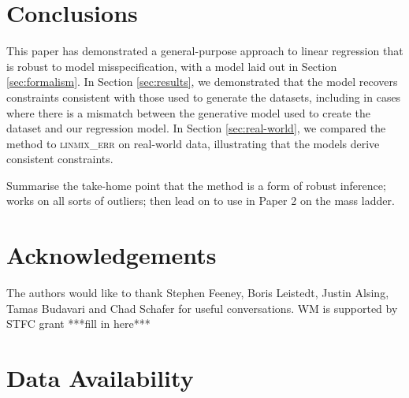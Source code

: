 \documentclass[fleqn,usenatbib]{mnras}
\begin{document}


\section{Conclusions}
\label{sec:conclusion}

This paper has demonstrated a general-purpose approach to linear regression that
is robust to model misspecification, with a model laid out in Section
\ref{sec:formalism}. In Section \ref{sec:results}, we demonstrated that the
model recovers constraints consistent with those used to generate the datasets,
including in cases where there is a mismatch between the generative model used
to create the dataset and our regression model. In Section \ref{sec:real-world},
we compared the method to \textsc{linmix\_err} \citep{Kelly:2007} on real-world
data, illustrating that the models derive consistent constraints.

Summarise the take-home point that the method is a form of robust inference;
works on all sorts of outliers; then lead on to use in Paper 2 on the mass
ladder.

\section*{Acknowledgements}

The authors would like to thank Stephen Feeney, Boris Leistedt, Justin Alsing,
Tamas Budavari and Chad Schafer for useful conversations. WM is supported by
STFC grant {\color{red} ***fill in here***}

\section*{Data Availability}
\end{document}
